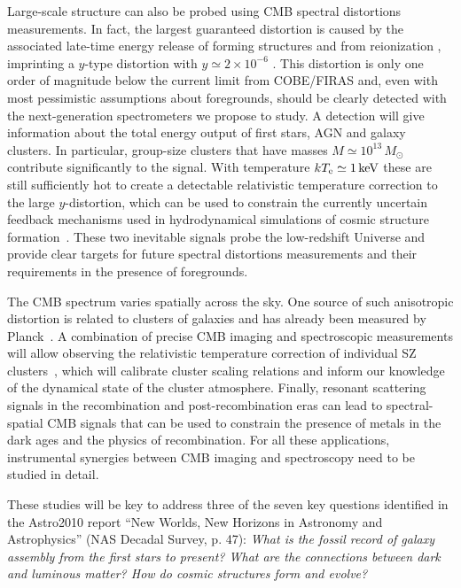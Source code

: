 Large-scale structure can also be probed using CMB spectral distortions measurements. In fact, the largest guaranteed distortion is caused by the associated late-time energy release of forming structures and from reionization \citep{Sunyaev1972b, Hu1994pert, Oh2003, Cen1999, Refregier2000}, imprinting a $y$-type distortion 
with $y \simeq 2\times 10^{-6}$ \citep[e.g.,][]{Refregier2000, Hill2015}. This distortion is only one order of magnitude below the current limit from COBE/FIRAS and, even with most pessimistic assumptions about foregrounds, should be clearly detected with the next-generation spectrometers we propose to study. A detection will give information about the total energy output of first stars, AGN and galaxy clusters. In particular, group-size clusters that have masses $M\simeq 10^{13}\,M_{\odot}$ contribute significantly to the signal. With temperature $k T_{\rm e}\simeq 1\,{\rm keV}$ these are still sufficiently hot to create a detectable relativistic temperature correction to the large $y$-distortion, 
which can be used to constrain the currently uncertain feedback mechanisms used in hydrodynamical simulations
of cosmic structure formation~\citep{Hill2015}. These two inevitable signals probe the low-redshift 
Universe and provide clear targets for future spectral distortions measurements and their requirements in the presence of foregrounds.

The CMB spectrum varies spatially across the sky. One source of such anisotropic distortion is related to clusters of galaxies and has already been measured by Planck~\citep{Planck2013SZ}. A combination of precise CMB imaging and spectroscopic measurements will allow observing the relativistic temperature correction of individual SZ clusters~\citep{Sazonov1998, Itoh98, Challinor98}, which will calibrate cluster scaling relations and inform our knowledge of the dynamical state of the cluster atmosphere. Finally, resonant scattering signals in the recombination \citep{Jose2005, Carlos2007Pol, Lewis2013} and post-recombination eras \citep{Kaustuv2004, Schleicher2008} can lead to spectral-spatial CMB signals that can be used to constrain the presence of metals in the dark ages and the physics of recombination. For all these applications, instrumental synergies between CMB imaging and spectroscopy need to be studied in detail. 



These studies will be key to address three of the seven key questions identified in the Astro2010 report ``New Worlds, New Horizons in Astronomy and Astrophysics'' (NAS Decadal Survey, p. 47): {\it What is the fossil record of galaxy assembly                                                                               
from the first stars to present? What are the connections between dark and luminous matter? How do cosmic structures form and evolve?}


